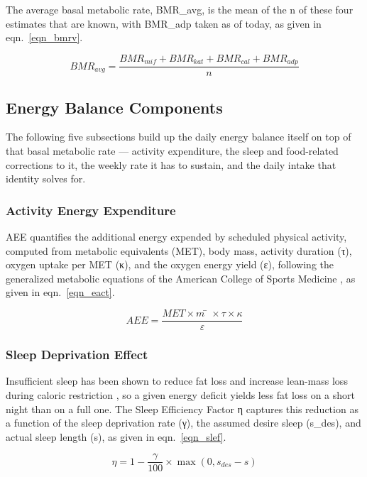 The average basal metabolic rate, BMR\_avg, is the mean of the n of these four estimates that are known, with BMR\_adp taken as of today, as given in eqn.~\eqref{eqn_bmrv}.

\begin{equation}
\label{eqn_bmrv}
BMR_{avg} = \frac{BMR_{mif} + BMR_{kat} + BMR_{cal} + BMR_{adp}}{n}
\end{equation}

\subsection{Energy Balance Components}

The following five subsections build up the daily energy balance itself on top of that basal metabolic rate — activity expenditure, the sleep and food-related corrections to it, the weekly rate it has to sustain, and the daily intake that identity solves for.

\subsubsection{Activity Energy Expenditure}

AEE quantifies the additional energy expended by scheduled physical activity, computed from metabolic equivalents (MET), body mass, activity duration (τ), oxygen uptake per MET (κ), and the oxygen energy yield (ε), following the generalized metabolic equations of the American College of Sports Medicine \cite{ref_acsm2017}, as given in eqn.~\eqref{eqn_eact}.

\begin{equation}
\label{eqn_eact}
AEE = \frac{MET × m̄ × τ × κ}{ε}
\end{equation}

\subsubsection{Sleep Deprivation Effect}

Insufficient sleep has been shown to reduce fat loss and increase lean-mass loss during caloric restriction \cite{ref_nedeltcheva2010}, so a given energy deficit yields less fat loss on a short night than on a full one. The Sleep Efficiency Factor η captures this reduction as a function of the sleep deprivation rate (γ), the assumed desire sleep (s\_des), and actual sleep length (s), as given in eqn.~\eqref{eqn_slef}.

\begin{equation}
\label{eqn_slef}
η = 1 − \frac{γ}{100} × \max(0, s_{des} − s)
\end{equation}

